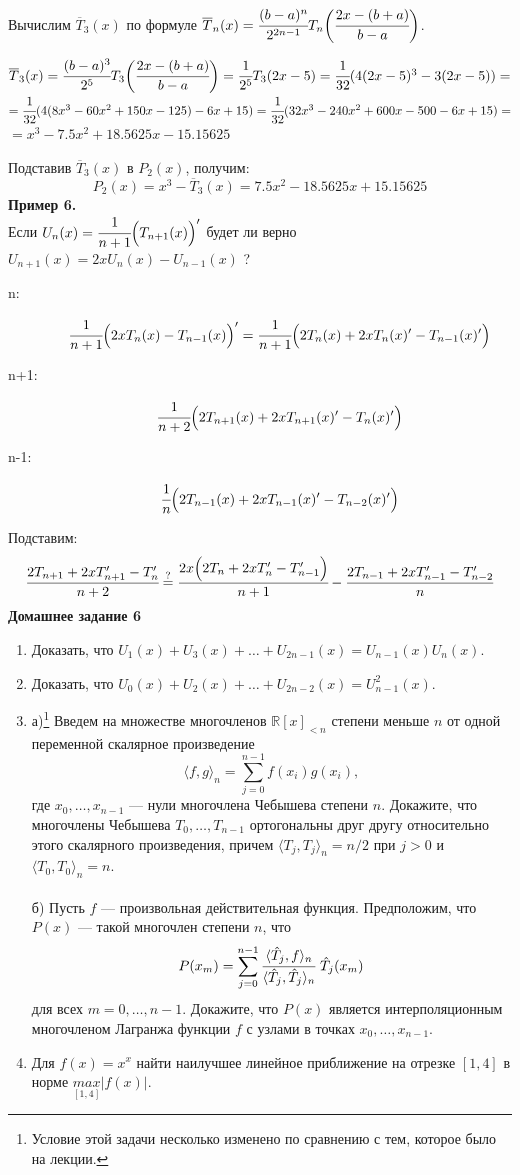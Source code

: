 \documentclass[12pt]{article}
\theoremstyle{definition}
\numberwithin{equation}{section}
\begin{document}
	Вычислим $\overline T_3(x)$ по формуле $\overline T_n(x) = \cfrac{(b-a)^n}{2^{2n-1}}T_n \bigg(\cfrac{2x-(b+a)}{b-a} \bigg)$.\\
	\begin{center}
		$\overline T_3(x)=\cfrac{(b-a)^3}{2^5}T_3 \bigg(\cfrac{2x-(b+a)}{b-a}\bigg) =\cfrac{1}{2^5}T_3(2x-5)=\cfrac{1}{32}(4(2x-5)^3-3(2x-5))=$\\
		$=\cfrac{1}{32}(4(8x^3-60x^2+150x-125)-6x+15)=\cfrac{1}{32}(32x^3-240x^2+600x-500-6x+15)=$\\
		$=x^3-7.5x^2+18.5625x-15.15625$\end{center}
	Подставив $\overline T_3(x)$ в $P_2(x)$, получим:
	$$P_2(x)=x^3-\overline T_3(x)=7.5x^2-18.5625x+15.15625$$ 
	\textbf{Пример 6.}\\
	Если $U_n(x)=\cfrac{1}{n+1} \Big(T_{n+1}(x)\Big)'$ будет ли верно $U_{n+1}(x)=2xU_n(x)-U_{n-1}(x)$ ?
	\begin{description} 
		\item[n:]
		$$\cfrac{1}{n+1}\Big(2xT_n(x)-T_{n-1}(x)\Big)'=\cfrac{1}{n+1}\Big(2T_n(x)+2xT_n(x)'-T_{n-1}(x)'\Big)$$
		\item[n+1:]
		$$\cfrac{1}{n+2}\Big(2T_{n+1}(x)+2xT_{n+1}(x)'-T_n(x)'\Big)$$
		\item[n-1:]
		$$\cfrac{1}{n}\Big(2T_{n-1}(x)+2xT_{n-1}(x)'-T_{n-2}(x)'\Big)$$
	\end{description}
	Подставим:
	$$\cfrac{2T_{n+1}+2xT_{n+1}'-T_n'}{n+2} \overset{?}{=}\cfrac{2x\Big(2T_n+2xT_n'-T_{n-1}'\Big)}{n+1}-\cfrac{2T_{n-1}+2xT_{n-1}'-T_{n-2}'}{n}$$
	\textbf{Домашнее задание 6}\begin{enumerate}
		\item
		Доказать, что $U_1(x)+U_3(x)+\dots+U_{2n-1}(x)=U_{n-1}(x)U_n(x).$
		\item
		Доказать, что $U_0(x)+U_2(x)+\dots+U_{2n-2}(x)=U_{n-1}^2(x).$
		\item 
		а)\footnote{Условие этой задачи несколько изменено по сравнению с тем, которое было на лекции.} Введем на множестве многочленов $\mathbb{R} [x]_{<n}$ 
		степени меньше $n$ от одной переменной скалярное произведение
		$$
		\langle f,g
		\rangle_n
		= \sum\limits_{j=0}^{n-1} f(x_i) g(x_i),
		$$
		где $x_0, \dots,x_{n-1}$ --- нули многочлена Чебышева степени $n$.
		Докажите, что многочлены Чебышева $T_0, \dots, T_{n-1}$ ортогональны друг другу относительно этого скалярного произведения, причем $\langle T_j,T_j
		\rangle_n = n/2$ при $j>0$ и $\langle T_0,T_0
		\rangle_n = n$.\\ \\
		б) Пусть $f$ --- произвольная действительная функция. Предположим, что 
		$P(x)$ --- такой многочлен степени $n$, что 
		$$P(x_m)=
		\sum\limits_{j=0}^{n-1}\cfrac{\langle \hat T_j, f\rangle_n}{\langle \hat T_j, \hat T_j\rangle_n}~\hat T_j(x_m)$$
		для всех $m=0,\dots,n-1$. 
		Докажите, что $P(x)$  является интерполяционным многочленом Лагранжа функции $f$ с узлами в точках $x_0, \dots,x_{n-1}$. 
		\item
		Для $f(x)=x^x$ найти наилучшее линейное приближение на отрезке $[1, 4]$ в норме $\underset{[1, 4]}{max}|f(x)|$.
	\end{enumerate}
	
\end{document}
